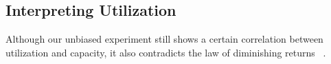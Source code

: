 \subsection{Interpreting Utilization}
\label{subsec:utilization}


Although our unbiased experiment still
shows a certain correlation between utilization and capacity, it also contradicts the
law of diminishing returns ~\cite{dasu-imc2014}. 